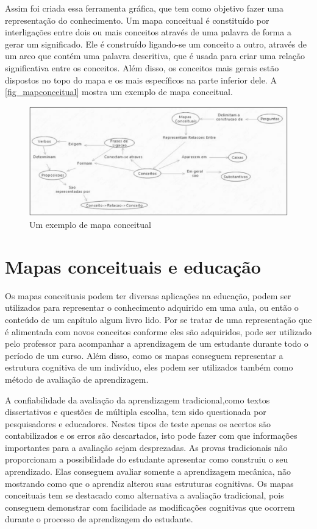 \documentclass[
	12pt,				%
	openright,			%
	oneside,			%
	a4paper,			%
	english,			%
	french,				%
	spanish,			%
	brazil				%
	]{abntex2}
\begin{document}
Assim foi criada essa ferramenta gráfica, que tem como objetivo fazer uma representação do conhecimento. Um mapa conceitual é constituído por interligações entre dois ou mais conceitos através de uma palavra de forma a gerar um significado. Ele é construído ligando-se um conceito a outro, através de um arco que contém uma palavra descritiva, que é usada para criar uma relação significativa entre os conceitos. Além disso, os conceitos mais gerais estão dispostos no topo do mapa e os mais específicos na parte inferior dele. A \autoref{fig_mapconceitual} mostra um exemplo de mapa conceitual.
\begin{figure}[htb]
	\caption{\label{fig_mapconceitual}Um exemplo de mapa conceitual}
	\begin{center}
		\includegraphics[scale=0.3]{mapaconceitual.png}
	\end{center}
\end{figure}
\section{Mapas conceituais e educação}

Os mapas conceituais podem ter diversas aplicações na educação, podem ser utilizados para representar o conhecimento adquirido em uma aula, ou então o conteúdo de um capítulo algum livro lido. Por se tratar de uma representação que é alimentada com novos conceitos conforme eles são adquiridos, pode ser utilizado pelo professor para acompanhar a aprendizagem de um estudante durante todo o período de um curso. Além disso, como os mapas conseguem representar a estrutura cognitiva de um indivíduo, eles podem ser utilizados também como método de avaliação de aprendizagem\cite{Perin2014}.

A confiabilidade da avaliação da aprendizagem tradicional,como textos dissertativos e questões de múltipla escolha, tem sido questionada por pesquisadores e educadores. Nestes tipos de teste apenas os acertos são contabilizados e os erros são descartados, isto pode fazer com que informações importantes para a avaliação sejam desprezadas.
As provas tradicionais não proporcionam a possibilidade do estudante apresentar como construiu o seu aprendizado. Elas conseguem avaliar somente a aprendizagem mecânica, não mostrando como que o aprendiz alterou suas estruturas cognitivas.
Os mapas conceituais tem se destacado como alternativa a avaliação tradicional, pois conseguem demonstrar com facilidade as modificações cognitivas que ocorrem durante o processo de aprendizagem do estudante\cite{Dutra2002}.
\end{document}
